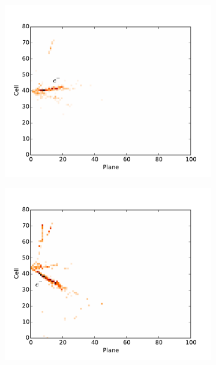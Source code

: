 \begin{figure}
\begin{center}
\vspace{-40pt}
\begin{subfigure}[c]{0.7\textwidth}
\includegraphics[width=\textwidth]{figures/cnn/view_truetype6_caltype6_event155_x.pdf}
\vspace{-20pt}
\caption*{\xview}
\end{subfigure}
\begin{subfigure}[c]{0.7\textwidth}
\includegraphics[width=\textwidth]{figures/cnn/view_truetype6_caltype6_event155_y.pdf}

\end{subfigure}
\end{center}
\end{figure}

